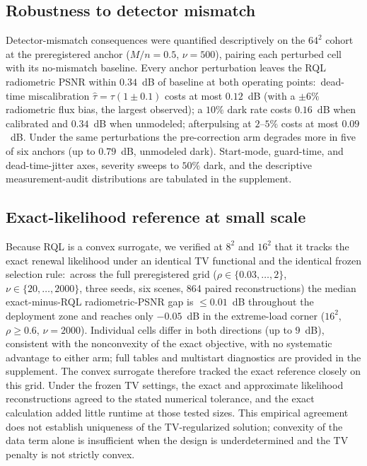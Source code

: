 \documentclass[10pt,twocolumn]{article}
\begin{document}
\subsection{Robustness to detector mismatch}
\label{sec:mismatch}
Detector-mismatch consequences were quantified descriptively on the
$64^{2}$ cohort at the preregistered anchor ($M/n = 0.5$, $\nu = 500$),
pairing each perturbed cell with its no-mismatch baseline. Every anchor
perturbation leaves the RQL radiometric PSNR within $0.34$~dB of
baseline at both operating points:\ dead-time miscalibration
$\hat\tau = \tau(1 \pm 0.1)$ costs at most $0.12$~dB (with a
$\pm 6\%$ radiometric flux bias, the largest observed); a $10\%$ dark
rate costs $0.16$~dB when calibrated and $0.34$~dB when unmodeled;
afterpulsing at $2$--$5\%$ costs at most $0.09$~dB. Under the same
perturbations the pre-correction arm degrades more in five of six
anchors (up to $0.79$~dB, unmodeled dark). Start-mode, guard-time, and
dead-time-jitter axes, severity sweeps to $50\%$ dark, and the
descriptive measurement-audit distributions are tabulated in the
supplement.

\subsection{Exact-likelihood reference at small scale}
Because RQL is a convex surrogate, we verified at $8^{2}$ and $16^{2}$
that it tracks the exact renewal likelihood under an identical TV
functional and the identical frozen selection rule:\ across the full
preregistered grid ($\rho \in \{0.03,\dots,2\}$, $\nu \in \{20,\dots,2000\}$,
three seeds, six scenes, 864 paired reconstructions) the median
exact-minus-RQL radiometric-PSNR gap is $\le 0.01$~dB throughout the
deployment zone and reaches only $-0.05$~dB in the extreme-load corner
($16^{2}$, $\rho \ge 0.6$, $\nu = 2000$). Individual cells differ in both
directions (up to $9$~dB), consistent with the nonconvexity of the exact
objective, with no systematic advantage to either arm; full tables and
multistart diagnostics are provided in the supplement. The convex
surrogate therefore tracked the exact reference closely on this grid. Under
the frozen TV settings,
the exact and approximate likelihood reconstructions agreed to the stated
numerical tolerance, and the exact calculation added little runtime at those
tested sizes. This empirical agreement does not establish uniqueness of the
TV-regularized solution; convexity of the data term alone is insufficient when
the design is underdetermined and the TV penalty is not strictly convex.
\end{document}
